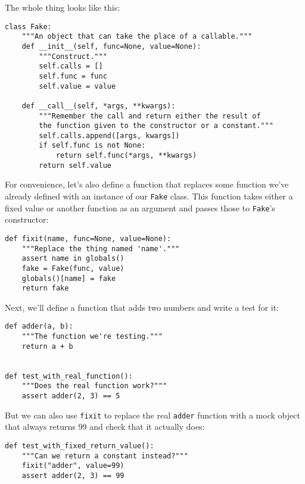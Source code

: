\documentclass{scrbook}
\begin{document}
The whole thing looks like this:


\begin{lstlisting}[frame=single,frameround=tttt]
class Fake:
    """An object that can take the place of a callable."""
    def __init__(self, func=None, value=None):
        """Construct."""
        self.calls = []
        self.func = func
        self.value = value

    def __call__(self, *args, **kwargs):
        """Remember the call and return either the result of
        the function given to the constructor or a constant."""
        self.calls.append([args, kwargs])
        if self.func is not None:
            return self.func(*args, **kwargs)
        return self.value
\end{lstlisting}



For convenience,
let's also define a function that replaces some function we've already defined
with an instance of our \texttt{Fake} class.
This function takes either a fixed value or another function as an argument
and passes those to \texttt{Fake}'s constructor:


\begin{lstlisting}[frame=single,frameround=tttt]
def fixit(name, func=None, value=None):
    """Replace the thing named 'name'."""
    assert name in globals()
    fake = Fake(func, value)
    globals()[name] = fake
    return fake
\end{lstlisting}



Next,
we'll define a function that adds two numbers
and write a test for it:


\begin{lstlisting}[frame=single,frameround=tttt]
def adder(a, b):
    """The function we're testing."""
    return a + b


def test_with_real_function():
    """Does the real function work?"""
    assert adder(2, 3) == 5
\end{lstlisting}



But we can also use \texttt{fixit} to replace the real \texttt{adder} function
with a mock object that always returns 99
and check that it actually does:


\begin{lstlisting}[frame=single,frameround=tttt]
def test_with_fixed_return_value():
    """Can we return a constant instead?"""
    fixit("adder", value=99)
    assert adder(2, 3) == 99
\end{lstlisting}
\end{document}
